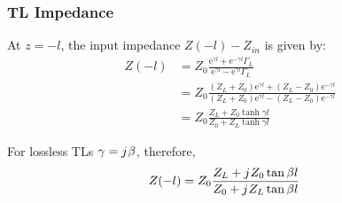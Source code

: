\documentclass[10pt, compress]{beamer}
\newcommand{\e}{\mathrm{e}} %
\renewcommand{\j}{{j}\mkern1mu} %
\begin{document}
\begin{frame}
  \frametitle{TL Impedance}
At $z = -l$, the input impedance $Z(-l) - Z_{in}$ is given by:
\begin{align*}
  Z(-l) &= Z_0 \frac{\e^{\gamma l} + \e^{-\gamma l}\Gamma_L}{\e^{\gamma l} - \e^{\gamma l}\Gamma_L} \\
  &= Z_0 \frac{\left(Z_L + Z_0\right)\e^{\gamma l} + \left(Z_L - Z_0\right) \e^{-\gamma l}}{\left(Z_L + Z_0\right)\e^{\gamma l} - \left(Z_L - Z_0\right) \e^{-\gamma l}} \\
  &= Z_0 \frac{Z_L + Z_0 \tanh{\gamma l}}{Z_0 + Z_L \tanh{\gamma l}}
\end{align*}

For lossless TLs $\gamma = \j \beta$, therefore,
\begin{align*}
Z(-l) &= Z_0 \frac{Z_L + \j Z_0 \tan{\beta l}}{Z_0 + \j Z_L \tan{\beta l}}  
\end{align*}
\end{frame}
\end{document}
